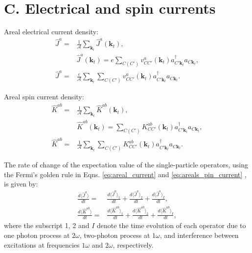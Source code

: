 \documentclass{article}
\begin{document}

\section{C. Electrical and spin currents} %
\label{sec:electrical_and_spin_currents}

Areal electrical current density:
\begin{align}\label{eq:areal_current}
    \hat{J}^{a} = & \frac{1}{\mathcal{A}} \sum_{\mathbf{k}_{t}} \hat{J}^{a}(\mathbf{k}_{t}), \nonumber \\
    & \hat{J}^{a}(\mathbf{k}_{t}) = e \sum_{C(C')}v^{a}_{CC'}(\mathbf{k}_{t})
    a^{\dag}_{C'\mathbf{k}_{t}} a_{C\mathbf{k}_{t}}, \nonumber \\
    \hat{J}^{a} = & \frac{e}{\mathcal{A}} \sum_{\mathbf{k}_{t}} \sum_{C(C')}v^{a}_{CC'}(\mathbf{k}_{t})
    a^{\dag}_{C'\mathbf{k}_{t}} a_{C\mathbf{k}_{t}}.
\end{align}

Areal spin current density:
\begin{align}\label{eq:areals_pin_current}
    \hat{K}^{ab} = & \frac{1}{\mathcal{A}} \sum_{\mathbf{k}_{t}} \hat{K}^{ab}(\mathbf{k}_{t}), \nonumber \\
    & \hat{K}^{ab}(\mathbf{k}_{t}) =   \sum_{C(C')}K^{ab}_{CC'}(\mathbf{k}_{t})
    a^{\dag}_{C'\mathbf{k}_{t}} a_{C\mathbf{k}_{t}}, \nonumber \\
    \hat{K}^{ab} = & \frac{1}{\mathcal{A}} \sum_{\mathbf{k}_{t}} \sum_{C(C')}K^{ab}_{CC'}(\mathbf{k}_{t})
    a^{\dag}_{C'\mathbf{k}_{t}} a_{C\mathbf{k}_{t}}.
\end{align}


The rate of change of the expectation value of the single-particle operators,
using the Fermi's golden rule in Eqns. \eqref{eq:areal_current} and \eqref{eq:areals_pin_current} , is given by:
\begin{align*}
    \frac{d\langle \hat{J}^{a}\rangle}{dt} = & \frac{d\langle \hat{J}^{a}\rangle_{1}}{dt} + 
    \frac{d\langle \hat{J}^{a}\rangle_{2}}{dt} + \frac{d\langle \hat{J}^{a}\rangle_{I}}{dt}, \\
    \frac{d\langle \hat{K}^{ab}\rangle}{dt} = & \frac{d\langle \hat{K}^{ab}\rangle_{1}}{dt} + 
    \frac{d\langle \hat{K}^{ab}\rangle_{2}}{dt} + \frac{d\langle \hat{K}^{ab}\rangle_{I}}{dt},
\end{align*}
where the subscript 1, 2 and $I$ denote the time evolution of each operator due to one photon process at $2\omega$, two-photon process at $1\omega$, and interference between excitations at frequencies $1\omega$ and $2\omega$, respectively.
\end{document}
